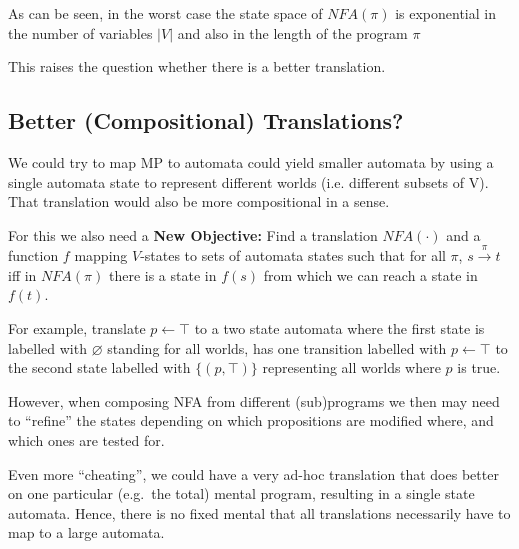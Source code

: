 
As can be seen, in the worst case the state space of $NFA(\pi)$ is exponential in the number of variables $|V|$ and also in the length of the program $\pi$

This raises the question whether there is a better translation.

\subsection{Better (Compositional) Translations?}

We could try to map MP to automata could yield smaller automata by using a single automata state to represent different worlds (i.e. different subsets of V).
That translation would also be more compositional in a sense.

For this we also need a \textbf{New Objective:}
Find a translation $NFA(\cdot)$ and a function $f$ mapping $V$-states to sets of automata states
such that for all $\pi$,
$s \xrightarrow{\pi} t$ iff
in $NFA(\pi)$ there is a state in $f(s)$ from which we can reach a state in $f(t)$.


For example, translate $p \leftarrow \top$ to a two state automata where the first state is labelled with $\varnothing$ standing for all worlds, has one transition labelled with $p \leftarrow \top$ to the second state labelled with $\{(p, \top)\}$ representing all worlds where $p$ is true.

However, when composing NFA from different (sub)programs we then may need to ``refine'' the states depending on which propositions are modified where, and which ones are tested for.


\smallskip

Even more ``cheating'', we could have a very ad-hoc translation that does better on one particular (e.g.\ the total) mental program, resulting in a single state automata.
Hence, there is no fixed mental that all translations necessarily have to map to a large automata.

